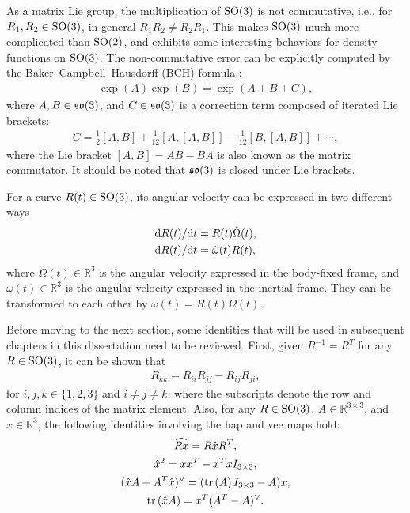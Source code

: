 As a matrix Lie group, the multiplication of $\mathrm{SO}(3)$ is not commutative, i.e., for $R_1, R_2\in\mathrm{SO}(3)$, in general $R_1R_2 \neq R_2R_1$.
This makes $\mathrm{SO}(3)$ much more complicated than $\mathrm{SO}(2)$, and exhibits some interesting behaviors for density functions on $\mathrm{SO}(3)$.
The non-commutative error can be explicitly computed by the Baker–Campbell–Hausdorff (BCH) formula \cite{hall2003lie}:
\begin{align}
	\exp(A) \exp(B) = \exp(A+B+C),
\end{align}
where $A,B\in\mathfrak{so}(3)$, and $C\in\mathfrak{so}(3)$ is a correction term composed of iterated Lie brackets:
\begin{align}
	C = \frac{1}{2}[A,B] + \frac{1}{12}[A,[A,B]] - \frac{1}{12}[B,[A,B]] + \cdots,
\end{align}
where the Lie bracket $[A,B] = AB-BA$ is also known as the matrix commutator.
It should be noted that $\mathfrak{so}(3)$ is closed under Lie brackets.

For a curve $R(t)\in\mathrm{SO}(3)$, its angular velocity can be expressed in two different ways
\begin{subequations}
	\begin{align}
		\mathrm{d} R(t) / \mathrm{d} t &= R(t)\hat{\Omega}(t), \\
		\mathrm{d} R(t) / \mathrm{d} t &= \hat{\omega}(t)R(t),
	\end{align}
\end{subequations}
where $\Omega(t)\in\mathbb{R}^3$ is the angular velocity expressed in the body-fixed frame, and $\omega(t)\in\mathbb{R}^3$ is the angular velocity expressed in the inertial frame.
They can be transformed to each other by $\omega(t) = R(t)\Omega(t)$.

Before moving to the next section, some identities that will be used in subsequent chapters in this dissertation need to be reviewed.
First, given $R^{-1} = R^T$ for any $R\in\mathrm{SO}(3)$, it can be shown that
\begin{align} \label{eqn:SO3-Rkk}
	R_{kk} = R_{ii}R_{jj} - R_{ij}R_{ji},
\end{align}
for $i,j,k\in\{1,2,3\}$ and $i\neq j\neq k$, where the subscripts denote the row and column indices of the matrix element.
Also, for any $R\in\mathrm{SO}(3)$, $A\in\mathbb{R}^{3\times 3}$, and $x\in\mathbb{R}^{3}$, the following identities involving the hap and vee maps hold:
\begin{gather}
	\widehat{Rx} = R\hat{x}R^T, \\
	\hat{x}^2 = xx^T - x^TxI_{3 \times 3}, \label{eqn:SO3-hatx^2} \\
	(\hat{x}A+A^T\hat{x})^\vee = (\mathrm{tr}\left( A \right)I_{3 \times 3}-A)x, \\
	\mathrm{tr}\left( \hat x A \right) = x^T(A^T -A)^\vee. \label{eqn:SO3-trhatxA}
\end{gather}

